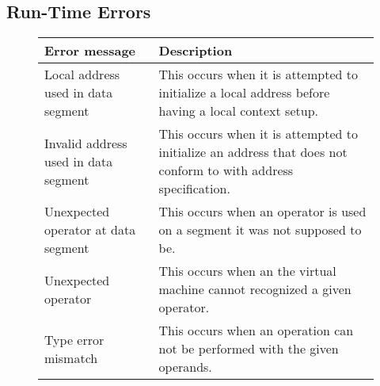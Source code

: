 \subsection{Run-Time Errors}
\begin{figure}[h]
    \centering
    \begin{tabular}{p{1.5in}p{2.5in}}
        \toprule
        \textbf{Error message} & \textbf{Description}\\

        \midrule Local address used \newline in data segment &
        This occurs when it is attempted to initialize a local address before
        having a local context setup.\\

        \midrule Invalid address used \newline in data segment &
        This occurs when it is attempted to initialize an address that does not
        conform to with address specification.\\

        \midrule Unexpected operator \newline at data segment &
        This occurs when an operator is used on a segment it was not supposed
        to be.\\

        \midrule Unexpected operator &
	This occurs when an the virtual machine cannot recognized a given 
	operator.\\

        \midrule Type error mismatch &
        This occurs when an operation can not be performed with the given
        operands.\\

        \bottomrule
    \end{tabular}
\end{figure}

